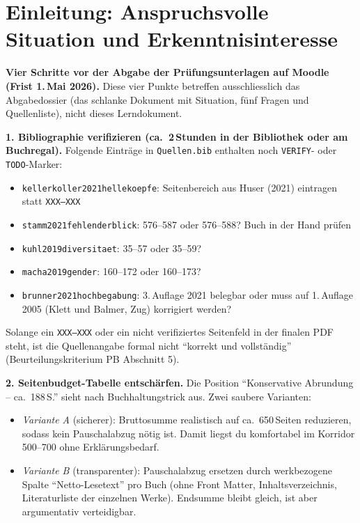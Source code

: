 \documentclass[ngerman, a4paper]{article}
\begin{document}
\newpage
{}
\renewcommand{\thepage}{\arabic{page}}

\section*{Einleitung: Anspruchsvolle Situation und Erkenntnisinteresse}
\label{sec:einleitung}

\begin{todomai}
\textbf{Vier Schritte vor der Abgabe der Prüfungsunterlagen auf Moodle (Frist 1.\,Mai 2026).}
Diese vier Punkte betreffen ausschliesslich das Abgabedossier (das schlanke Dokument mit Situation, fünf Fragen und Quellenliste), nicht dieses Lerndokument.

\medskip
\textbf{1. Bibliographie verifizieren (ca.\ 2\,Stunden in der Bibliothek oder am Buchregal).}
Folgende Einträge in \texttt{Quellen.bib} enthalten noch \texttt{VERIFY}- oder \texttt{TODO}-Marker:
\begin{itemize}\setlength{\itemsep}{0pt}
  \item \texttt{kellerkoller2021hellekoepfe}: Seitenbereich aus Huser (2021) eintragen statt \texttt{XXX--XXX}
  \item \texttt{stamm2021fehlenderblick}: 576--587 oder 576--588? Buch in der Hand prüfen
  \item \texttt{kuhl2019diversitaet}: 35--57 oder 35--59?
  \item \texttt{macha2019gender}: 160--172 oder 160--173?
  \item \texttt{brunner2021hochbegabung}: 3.\,Auflage 2021 belegbar oder muss auf 1.\,Auflage 2005 (Klett und Balmer, Zug) korrigiert werden?
\end{itemize}
Solange ein \texttt{XXX--XXX} oder ein nicht verifiziertes Seitenfeld in der finalen PDF steht, ist die Quellenangabe formal nicht \enquote{korrekt und vollständig} (Beurteilungskriterium PB Abschnitt 5).

\medskip
\textbf{2. Seitenbudget-Tabelle entschärfen.}
Die Position \enquote{Konservative Abrundung -- ca.~188\,S.} sieht nach Buchhaltungstrick aus. Zwei saubere Varianten:
\begin{itemize}\setlength{\itemsep}{0pt}
  \item \textit{Variante A} (sicherer): Bruttosumme realistisch auf ca.~650\,Seiten reduzieren, sodass kein Pauschalabzug nötig ist. Damit liegst du komfortabel im Korridor 500--700 ohne Erklärungsbedarf.
  \item \textit{Variante B} (transparenter): Pauschalabzug ersetzen durch werkbezogene Spalte \enquote{Netto-Lesetext} pro Buch (ohne Front Matter, Inhaltsverzeichnis, Literaturliste der einzelnen Werke). Endsumme bleibt gleich, ist aber argumentativ verteidigbar.
\end{itemize}


\end{todomai}
\end{document}
